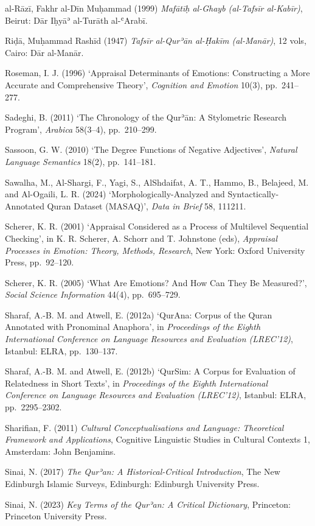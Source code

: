 al-Rāzī, Fakhr al-Dīn Muḥammad (1999) \emph{Mafātīḥ al-Ghayb (al-Tafsīr
al-Kabīr)}, Beirut: Dār Iḥyāʾ al-Turāth al-ʿArabī.

Riḍā, Muḥammad Rashīd (1947) \emph{Tafsīr al-Qurʾān al-Ḥakīm
(al-Manār)}, 12 vols, Cairo: Dār al-Manār.

Roseman, I. J. (1996) `Appraisal Determinants of Emotions: Constructing
a More Accurate and Comprehensive Theory', \emph{Cognition and Emotion}
10(3), pp.~241--277.

Sadeghi, B. (2011) `The Chronology of the Qurʾān: A Stylometric Research
Program', \emph{Arabica} 58(3--4), pp.~210--299.

Sassoon, G. W. (2010) `The Degree Functions of Negative Adjectives',
\emph{Natural Language Semantics} 18(2), pp.~141--181.

Sawalha, M., Al-Shargi, F., Yagi, S., AlShdaifat, A. T., Hammo, B.,
Belajeed, M. and Al-Ogaili, L. R. (2024) `Morphologically-Analyzed and
Syntactically-Annotated Quran Dataset (MASAQ)', \emph{Data in Brief} 58,
111211.

Scherer, K. R. (2001) `Appraisal Considered as a Process of Multilevel
Sequential Checking', in K. R. Scherer, A. Schorr and T. Johnstone
(eds), \emph{Appraisal Processes in Emotion: Theory, Methods, Research},
New York: Oxford University Press, pp.~92--120.

Scherer, K. R. (2005) `What Are Emotions? And How Can They Be
Measured?', \emph{Social Science Information} 44(4), pp.~695--729.

Sharaf, A.-B. M. and Atwell, E. (2012a) `QurAna: Corpus of the Quran
Annotated with Pronominal Anaphora', in \emph{Proceedings of the Eighth
International Conference on Language Resources and Evaluation
(LREC'12)}, Istanbul: ELRA, pp.~130--137.

Sharaf, A.-B. M. and Atwell, E. (2012b) `QurSim: A Corpus for Evaluation
of Relatedness in Short Texts', in \emph{Proceedings of the Eighth
International Conference on Language Resources and Evaluation
(LREC'12)}, Istanbul: ELRA, pp.~2295--2302.

Sharifian, F. (2011) \emph{Cultural Conceptualisations and Language:
Theoretical Framework and Applications}, Cognitive Linguistic Studies in
Cultural Contexts 1, Amsterdam: John Benjamins.

Sinai, N. (2017) \emph{The Qurʾan: A Historical-Critical Introduction},
The New Edinburgh Islamic Surveys, Edinburgh: Edinburgh University
Press.

Sinai, N. (2023) \emph{Key Terms of the Qurʾan: A Critical Dictionary},
Princeton: Princeton University Press.


